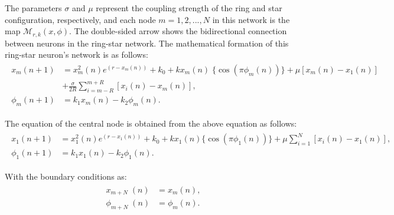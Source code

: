 \documentclass{article}
\begin{document}
\noindent The parameters $\sigma$ and $\mu$ represent the coupling strength of the ring and star configuration, respectively, and each node $m=1,2,..., N$ in this network is the map $\mathcal{M}_{r,k}(x,\phi)$. The double-sided arrow shows the bidirectional connection between neurons in the ring-star network. The mathematical formation of this ring-star neuron's network is as follows:
\begin{align}
   \begin{split}
    x_{m}(n+1)&=x_m^2(n)e^{\left(r-x_m(n)\right)}+k_0+kx_m(n)\;\{\cos(\pi\phi_m(n))\}+\mu[x_m(n)-x_1(n)]\\
    &+\frac{\sigma}{2R}\sum_{i=m-R}^{m+R}[x_i(n)-x_m(n)],\\
    \phi_{m}(n+1)&=k_1x_{m}(n)-k_2\phi_{m}(n).
   \end{split}\label{general}
\end{align}

\noindent The equation of the central node is obtained from the above equation as follows:
\begin{align}\label{central}
\begin{split}
    x_{1}(n+1)&=x_1^2(n)e^{\left(r-x_1(n)\right)}+k_0+kx_1(n)\{\cos(\pi\phi_1(n))\}+\mu\sum_{i=1}^{N}[x_i(n)-x_{1}(n)],\\
    \phi_{1}(n+1)&=k_1x_{1}(n)-k_2\phi_{1}(n).
    \end{split}
\end{align}

\noindent With the boundary conditions as:
\begin{align}\label{condition}
\begin{split}
x_{m+N}\;(n)&=x_{m}(n),\\
\phi_{m+N}\;(n)&=\phi_{m}(n).
\end{split}
\end{align}
\end{document}
